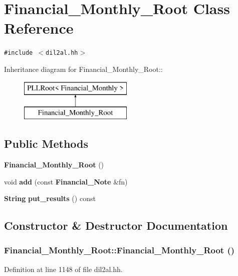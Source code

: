 \section{Financial\_\-Monthly\_\-Root  Class Reference}
\label{classFinancial__Monthly__Root}
{\tt \#include $<$dil2al.hh$>$}

Inheritance diagram for Financial\_\-Monthly\_\-Root::\begin{figure}[H]
\begin{center}
\leavevmode
\includegraphics[height=2cm]{classFinancial__Monthly__Root}
\end{center}
\end{figure}
\subsection*{Public Methods}
\begin{CompactItemize}
\item 
{\bf Financial\_\-Monthly\_\-Root} ()
\item 
void {\bf add} (const {\bf Financial\_\-Note} \&fn)
\item 
{\bf String} {\bf put\_\-results} () const
\end{CompactItemize}


\subsection{Constructor \& Destructor Documentation}
\subsubsection{\setlength{\rightskip}{0pt plus 5cm}Financial\_\-Monthly\_\-Root::Financial\_\-Monthly\_\-Root ()\hspace{0.3cm}{\tt  [inline]}}\label{classFinancial__Monthly__Root_a0}




Definition at line 1148 of file dil2al.hh.



